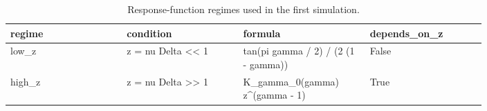 \documentclass{article}
\begin{document}
\begin{table}[ht]
\centering
\caption{Response-function regimes used in the first simulation.}
\label{tab:response-regimes-v1}
\begin{tabular}{p{0.20\linewidth}p{0.20\linewidth}p{0.20\linewidth}p{0.20\linewidth}}
\toprule
regime & condition & formula & depends\_on\_z \\
\midrule
low\_z & z = nu Delta << 1 & tan(pi gamma / 2) / (2 (1 - gamma)) & False \\
high\_z & z = nu Delta >> 1 & K\_gamma\_0(gamma) z^(gamma - 1) & True \\
\bottomrule
\end{tabular}
\end{table}
\end{document}
